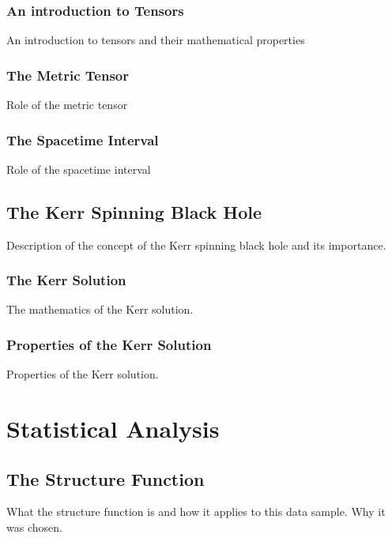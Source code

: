 \documentclass[12pt, oneside]{smuthesis}
\begin{document}
\subsection{\sc An introduction to Tensors}

An introduction to tensors and their mathematical properties

\subsection{\sc The Metric Tensor}

Role of the metric tensor

\subsection{\sc The Spacetime Interval}

Role of the spacetime interval

\section{\sc The Kerr Spinning Black Hole}

Description of the concept of the Kerr spinning black hole and its importance.

\subsection{\sc The Kerr Solution}

The mathematics of the Kerr solution.

\subsection{\sc Properties of the Kerr Solution}

Properties of the Kerr solution.

\chapter{\sc Statistical Analysis}

\section{\sc The Structure Function}

\citep{collier2001}
\citep{test1}
\citep{test2}
What the structure function is and how it applies to this data sample. Why it was chosen.
\end{document}
